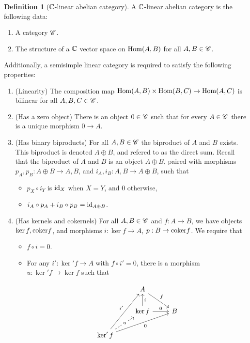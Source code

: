 \documentclass{article}
\theoremstyle{definition}
\newtheorem*{definition}{Definition}
\numberwithin{figure}{section}
\begin{document}
\begin{definition}[$\mathbb{C}$-linear abelian category]  A $\mathbb{C}$-linear abelian category is the following data:

\begin{enumerate}
\item A category $\mathscr{C}$.
\item The structure of a $\mathbb{C}$ vector space on $\mathrm{Hom}(A,B)$ for all $A,B\in \mathscr{C}$.
\end{enumerate}

Additionally, a semisimple linear category is required to satisfy the following properties:

\begin{enumerate}
\item (Linearity) The composition map $\mathrm{Hom}(A,B)\times \mathrm{Hom}(B,C)\to \mathrm{Hom}(A,C)$ is bilinear for all $A,B,C\in \mathscr{C}$.
\item (Has a zero object) There is an object $0\in \mathscr{C}$ such that for every $A\in \mathscr{C}$ there is a unique morphism $0\to A$.
\item (Has binary biproducts) For all $A,B\in \mathscr{C}$ the biproduct of $A$ and $B$ exists. This biproduct is denoted $A\oplus B$, and refered to as the direct sum. Recall that the biproduct of $A$ and $B$ is an object $A\oplus B$, paired with morphisms $p_{A},p_{B}: A\oplus B\to A,B$, and  $i_{A},i_{B}: A,B\to A\oplus B$, such that

\begin{itemize}
\item $p_{X}\circ i_{Y}$ is $\mathrm{id}_X$ when $X=Y$, and $0$ otherwise,
\item $i_{A}\circ p_{A}+i_{B}\circ p_{B}=\mathrm{id}_{A\oplus B}$.
\end{itemize}
\item (Has kernels and cokernels) For all $A,B\in \mathscr{C}$ and $f:A\to B$, we have objects $\ker f, \mathrm{coker} f$, and morphisms $i:\ker f\to A$, $p: B\to \mathrm{coker} f$. We require that

\begin{itemize}
\item $f\circ i=0$.
\item For any $i': \ker' f\to A$ with $f\circ i'=0$, there is a morphism $u: \ker'f\to \ker f$ such that

\[\begin{tikzcd}
	& A \\
	& {\ker f} & B \\
	{\ker' f}
	\arrow["f", from=1-2, to=2-3]
	\arrow["{i'}", from=3-1, to=1-2]
	\arrow["0"', from=3-1, to=2-3]
	\arrow["i"', from=2-2, to=1-2]
	\arrow["0", from=2-2, to=2-3]
	\arrow["u"{description}, dashed, from=3-1, to=2-2]
\end{tikzcd}\]


\end{itemize}
\end{enumerate}
\end{definition}
\end{document}
